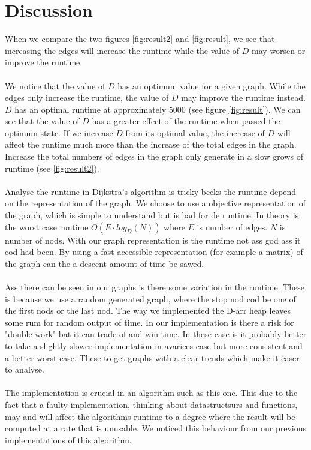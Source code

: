 \documentclass[paper=a4, fontsize=11pt]{scrartcl}
\numberwithin{equation}{section}		%
\numberwithin{figure}{section}			%
\numberwithin{table}{section}				%
\begin{document}
\section{Discussion}
When we compare the two figures \ref{fig:result2} and \ref{fig:result}, we see that increasing the edges will increase the runtime while the value of $D$ may worsen or improve the runtime. 
\\~\\
We notice that the value of $D$ has an optimum value for a given graph. While the edges only increase the runtime, the value of $D$ may improve the runtime instead. $D$ has an optimal runtime at approximately $5000$ (see figure \ref{fig:result}).
We can see that the value of $D$ has a greater effect of the runtime when passed the optimum state. If we increase $D$ from its optimal value, the increase of $D$ will affect the runtime much more than the increase of the total edges in the graph. Increase the total numbers of edges in the graph only generate in a slow grows of runtime (see \ref{fig:result2}).
\\~\\
Analyse the runtime in Dijkstra’s algorithm is tricky becks the runtime depend on the representation of the graph. We choose to use a objective representation of the graph, which is simple to understand but is bad for de runtime. In theory is the worst case runtime $O(E\cdot log_D(N))$ where $E$ is number of edges. $N$ is number of nods. With our graph representation is the runtime not ass god ass it cod had been. By using a fast accessible representation (for example a matrix) of the graph can the a descent amount of time be sawed.
\\~\\
Ass there can be seen in our graphs is there some variation in the runtime. These is because we use a random generated graph, where the stop nod cod be one of the first nods or the last nod. The way we implemented the D-arr heap leaves some rum for random output of time. In our implementation is there a risk for "double work" bat it can trade of and win time. In these case is it probably better to take a slightly slower implementation in avarices-case but more consistent and a better worst-case. These to get graphs with a clear trends which make it easer to analyse.
\\~\\
The implementation is crucial in an algorithm such as this one. This due to the fact that a faulty implementation, thinking about datastructsurs and functions, may and will affect the algorithms runtime to a degree where the result will be computed at a rate that is unusable. We noticed this behaviour from our previous implementations of this algorithm.
\end{document}
